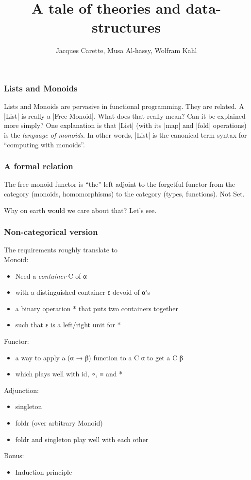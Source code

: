\documentclass[serif,mathserif,professionalfont,10pt]{beamer}
\title{A tale of theories and data-structures}
\author[Carette, Al-hassy, Kahl]{Jacques Carette, Musa Al-hassy, Wolfram Kahl}
\institute[McMaster]{McMaster University, Hamilton}
\begin{document}
\frame{\titlepage}

\begin{frame}
\frametitle{Lists and Monoids}
Lists and Monoids are pervasive in functional programming.
They are related. A |List| is really a |Free Monoid|. What does that really mean?
Can it be explained more simply? One explanation is that |List| (with its |map| and
|fold| operations) is the \emph{language of monoids}. In other words, |List| is the
canonical term syntax for ``computing with monoids''.
\end{frame}

\begin{frame}
\frametitle{A formal relation}
The free monoid functor is ``the'' left adjoint to the forgetful functor from
the category (monoids, homomorphisms) to the category (types, functions). Not Set.

Why on earth would we care about that? Let's see.

\end{frame}

\begin{frame}
\frametitle{Non-categorical version}
The requirements roughly translate to\\
Monoid:
\begin{itemize}
\item Need a \emph{container} C of α
\item with a distinguished container ε devoid of α's
\item a binary operation * that puts two containers together
\item such that ε is a left/right unit for *
\end{itemize}
Functor:
\begin{itemize}
\item a way to apply a (α → β) function to a C α to get a C β
\item which plays well with id, ∘, ≡ and *
\end{itemize}
Adjunction:
\begin{itemize}
\item singleton
\item foldr (over arbitrary Monoid)
\item foldr and singleton play well with each other
\end{itemize}
Bonus:
\begin{itemize}
\item Induction principle
\end{itemize}
\end{frame}
\end{document}
